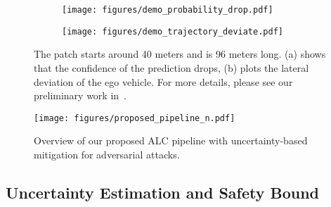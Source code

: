 \begin{figure}
    \centering
    \begin{subfigure}{\columnwidth}
        \texttt{[image: figures/demo\_probability\_drop.pdf]}
        \caption{}
        \label{fig:prob_drop}
    \end{subfigure}%
    
    \begin{subfigure}{\columnwidth}
        \texttt{[image: figures/demo\_trajectory\_deviate.pdf]}
        \caption{}
        \label{fig:traj_deviate}
    \end{subfigure}
    \caption{The patch starts around 40 meters and is 96 meters long. (a) shows that the confidence of the prediction drops, (b) plots the lateral deviation of the ego vehicle. For more details, please see our preliminary work in~\cite{liang2021endtoend}.%
    }
    \label{fig:conf}
    \vspace{-12pt}
\end{figure}

\begin{figure*}[!ht]
    \centering
    \texttt{[image: figures/proposed\_pipeline\_n.pdf]}
    \caption{Overview of our proposed ALC pipeline with uncertainty-based mitigation for adversarial attacks.}
    \label{fig:pipeline}
\end{figure*}
\subsection{Uncertainty Estimation and Safety Bound}\label{uncertainty bound}

